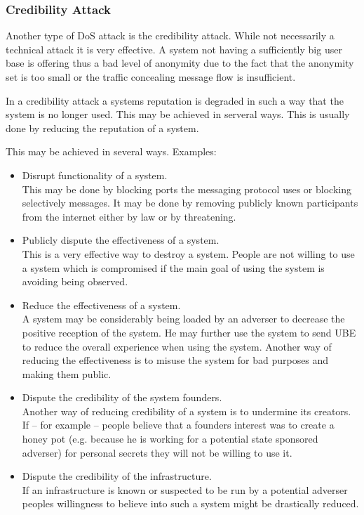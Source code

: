 \subsubsection{Credibility Attack}
Another type of DoS attack is the credibility attack. While not necessarily a technical attack it is very effective. A system not having a sufficiently big user base is offering thus a bad level of anonymity due to the fact that the anonymity set is too small or the traffic concealing message flow is insufficient. 

In a credibility attack a systems reputation is degraded in such a way that the system is no longer used. This may be achieved in serveral ways. This is usually done by reducing the reputation of a system.

This may be achieved in several ways. Examples:
\begin{itemize}
	\item Disrupt functionality of a system.\\ 
	This may be done by blocking ports the messaging protocol uses or blocking selectively messages. It may be done by removing publicly known participants from the internet either by law or by threatening.
	\item Publicly dispute the effectiveness of a system.\\
	This is a very effective way to destroy a system. People are not willing to use a system which is compromised if the main goal of using the system is avoiding being observed.
	\item Reduce the effectiveness of a system.\\
	A system may be considerably being loaded by an adverser to decrease the positive reception of the system. He may further use the system to send UBE to reduce the overall experience when using the system. Another way of reducing the effectiveness is to misuse the system for bad purposes and making them public.
	\item Dispute the credibility of the system founders.\\
	Another way of reducing credibility of a system is to undermine its creators. If -- for example -- people believe that a founders interest was to create a honey pot (e.g. because he is working for a potential state sponsored adverser) for personal secrets they will not be willing to use it.
	\item Dispute the credibility of the infrastructure.\\
	If an infrastructure is known or suspected to be run by a potential adverser peoples willingness to believe into such a system might be drastically reduced.
\end{itemize}

